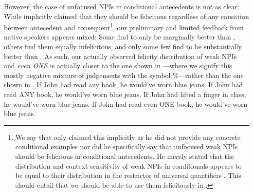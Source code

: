 However, the case of unfocused NPIs in conditional antecedents is not as clear: While \textcite{Crnic2014-dogma} implicitly claimed that they should be felicitous regardless of any causation between antecedent and consequent\footnote{We say that \textcite{Crnic2014-dogma} only claimed this implicitly as he did not provide any concrete conditional examples nor did he specifically say that unfocused weak NPIs should be felicitous in conditional antecedents. He merely stated that the distribution and context-sensitivity of weak NPIs in conditionals appears to be equal to their distribution in the restrictor of universal quantifiers \parencite[p.~122--124]{Crnic2014-dogma}. This should entail that we should be able to use them felicitously in .}, our preliminary and limited feedback from native speakers appears mixed: Some find  to only be marginally better than , others find them equally infelicitous, and only some few find  to be substantially better than . As such, our actually observed felicity distribution of weak NPIs and \textit{even \MakeUppercase{one}} is actually closer to the one shown in ---where we signify this mostly negative mixture of judgements with the symbol \%---rather than the one shown in . \pex\label{ex:npi-conditional-bad-actual}
\a\ljudge{\%} If John had read any book, he would've worn blue jeans.
\a\ljudge{\#} If John had read \MakeUppercase{any} book, he would've worn blue jeans.
\a\ljudge{\#} If John had lifted a finger in class, he would've worn blue jeans.
\a\ljudge{\#} If John had read even \MakeUppercase{one} book, he would've worn blue jeans.
\xe

